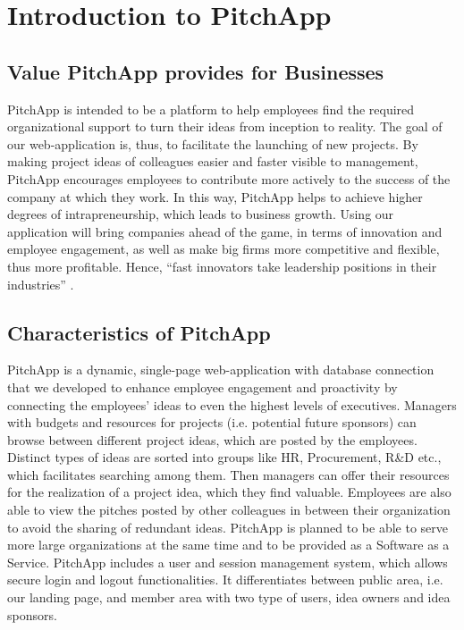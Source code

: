 \chapter{Introduction to PitchApp}

\section{Value PitchApp provides for Businesses}

PitchApp is intended to be a platform to help employees find the required organizational support to turn their ideas from inception to reality. The goal of our web-application is, thus, to facilitate the launching of new projects. By making project ideas of colleagues easier and faster visible to management, PitchApp encourages employees to contribute more actively to the success of the company at which they work. In this way, PitchApp helps to achieve higher degrees of intrapreneurship, which leads to business growth. Using our application will bring companies ahead of the game, in terms of innovation and
employee engagement, as well as make big firms more competitive and flexible, thus more
profitable. Hence, “fast innovators take leadership positions in their industries” \parencite{SH90}.

\section{Characteristics of PitchApp}

PitchApp is a dynamic, single-page web-application with database connection that we developed to enhance employee engagement and proactivity by connecting the employees’ ideas to even the highest levels of executives. Managers with budgets and resources for projects (i.e. potential future sponsors) can browse between different project ideas, which are posted by the employees. Distinct types of ideas are sorted into groups like HR, Procurement, R\&D etc., which facilitates searching among them. Then managers can offer their resources for the realization of a project idea, which they find valuable. Employees are also able to view the pitches posted by other colleagues in between their organization to avoid the sharing of redundant ideas. PitchApp is planned to be able to serve more large organizations at the same time and to be provided as a Software as a Service. PitchApp includes a user and session management system, which allows secure login and logout functionalities. It differentiates between public area, i.e. our landing page, and member area with two type of users, idea owners and idea sponsors.

